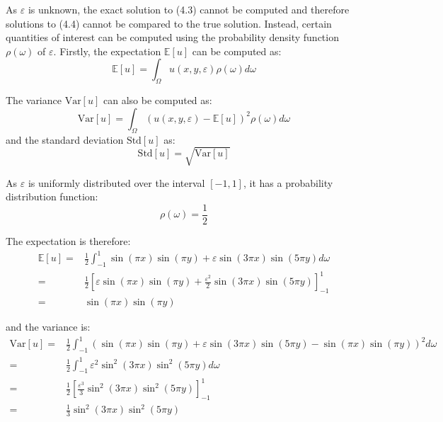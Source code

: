 \documentclass{article}
\numberwithin{equation}{section}
\begin{document}
As $\varepsilon$ is unknown, the exact solution to (4.3) cannot be computed and therefore solutions to (4.4) cannot be compared to the true solution. Instead, certain quantities of interest can be computed using the probability density function $\rho(\omega)$ of $\varepsilon$. Firstly, the expectation $\mathbb{E}[u]$ can be computed as:
\begin{equation}
\mathbb{E}[u] = \int_{\Omega} u(x,y,\varepsilon) \rho(\omega) d \omega
\end{equation}

The variance $\text{Var}[u]$ can also be computed as:
\begin{equation}
\text{Var}[u] = \int_{\Omega} \left(u(x,y,\varepsilon) - \mathbb{E}[u] \right)^2 \rho(\omega) d \omega
\end{equation}
and the standard deviation $\text{Std}[u]$ as:
\begin{equation}
\text{Std}[u] = \sqrt{\text{Var}[u]}
\end{equation}

As $\varepsilon$ is uniformly distributed over the interval $[-1,1]$, it has a probability distribution function:
\begin{equation}
\rho(\omega) = \frac{1}{2}
\end{equation}

The expectation is therefore:
\begin{equation}
\begin{split}
\mathbb{E}[u] = & \frac{1}{2} \int_{-1}^1 \sin(\pi x)\sin(\pi y) + \varepsilon \sin(3 \pi x) \sin(5 \pi y) d \omega \\
= & \frac{1}{2} \left[\varepsilon \sin(\pi x) \sin(\pi y) + \frac{\varepsilon^2}{2} \sin(3 \pi x) \sin(5 \pi y)\right]_{-1}^{1} \\
= & \sin(\pi x) \sin(\pi y)
\end{split}
\end{equation}

and the variance is:
\begin{equation}
\begin{split}
\text{Var}[u] = & \frac{1}{2} \int_{-1}^1 (\sin(\pi x) \sin(\pi y) + \varepsilon \sin(3 \pi x) \sin(5 \pi y) - \sin(\pi x) \sin(\pi y))^2 d \omega \\
= & \frac{1}{2} \int_{-1}^1 \varepsilon^2 \sin^2 (3 \pi x) \sin^2 (5 \pi y) d \omega \\
= & \frac{1}{2} \left[ \frac{\varepsilon^3}{3} \sin^2 (3 \pi x) \sin^2 (5 \pi y) \right]_{-1}^1 \\
= & \frac{1}{3} \sin^2 (3 \pi x) \sin^2 (5 \pi y)
\end{split}
\end{equation}
\end{document}
